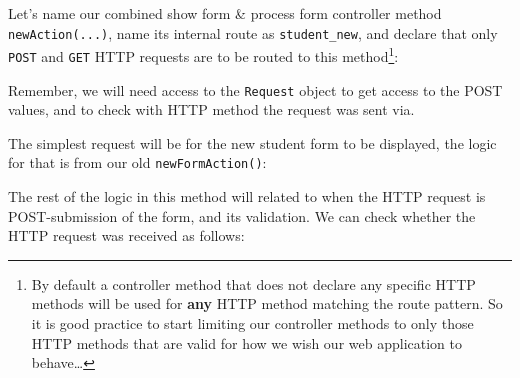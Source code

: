 \documentclass[a4paperpaper,openright]{book}
\newenvironment{Shaded}{}{}
\newcommand{\AnnotationTok}[1]{\textcolor[rgb]{0.38,0.63,0.69}{\textbf{\textit{#1}}}}
\newcommand{\CommentTok}[1]{\textcolor[rgb]{0.38,0.63,0.69}{\textit{#1}}}
\newcommand{\KeywordTok}[1]{\textcolor[rgb]{0.00,0.44,0.13}{\textbf{#1}}}
\newcommand{\NormalTok}[1]{#1}
\newcommand{\OtherTok}[1]{\textcolor[rgb]{0.00,0.44,0.13}{#1}}
\newcommand{\StringTok}[1]{\textcolor[rgb]{0.25,0.44,0.63}{#1}}
\begin{document}
Let's name our combined show form \& process form controller method
\texttt{newAction(...)}, name its internal route as
\texttt{student\_new}, and declare that only \texttt{POST} and
\texttt{GET} HTTP requests are to be routed to this method\footnote{By
  default a controller method that does not declare any specific HTTP
  methods will be used for \textbf{any} HTTP method matching the route
  pattern. So it is good practice to start limiting our controller
  methods to only those HTTP methods that are valid for how we wish our
  web application to behave\ldots{}}:

\begin{Shaded}
\end{Shaded}

Remember, we will need access to the \texttt{Request} object to get
access to the POST values, and to check with HTTP method the request was
sent via.

The simplest request will be for the new student form to be displayed,
the logic for that is from our old \texttt{newFormAction()}:

\begin{Shaded}
\end{Shaded}

The rest of the logic in this method will related to when the HTTP
request is POST-submission of the form, and its validation. We can check
whether the HTTP request was received as follows:

\begin{Shaded}
\end{Shaded}
\end{document}
